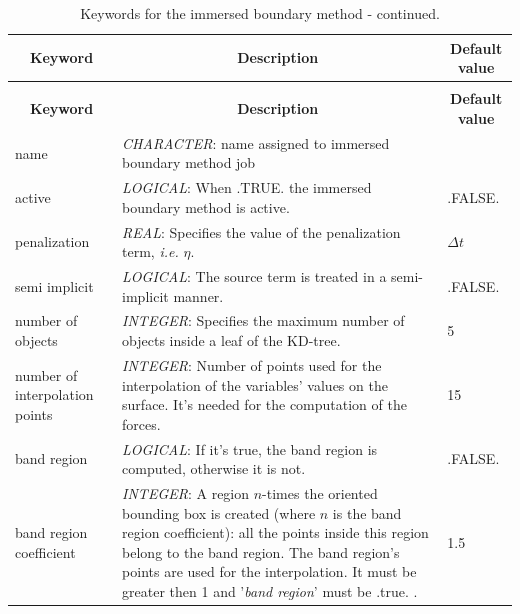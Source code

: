 \documentclass[a4paper,10pt]{report}
\begin{document}
\begin{longtable}{|p{4cm}|p{10cm}|p{2.2cm}|}
\caption{Keywords for the immersed boundary method.} \label{tab:IBMtab} \\
\hline
\multicolumn{1}{|c|}{\textbf{Keyword}} & \multicolumn{1}{c|}{\textbf{Description}} & \multicolumn{1}{c|}{\textbf{Default value}} \\ \hline
\endfirsthead

\caption{Keywords for the immersed boundary method - continued.} \\
\hline
\multicolumn{1}{|c|}{\textbf{Keyword}} & \multicolumn{1}{c|}{\textbf{Description}} & \multicolumn{1}{c|}{\textbf{Default value}} \\ \hline
\endhead

name & \textit{CHARACTER}: name assigned to immersed boundary method job &  \\ \hline

active & \textit{LOGICAL}: When .TRUE. the immersed boundary method is active. & .FALSE. \\ \hline

penalization & \textit{REAL}: Specifies the value of the penalization term, \textit{i.e.} $\eta$. & $\Delta t$ \\ \hline

semi implicit & \textit{LOGICAL}: The source term is treated in a semi-implicit manner. & .FALSE. \\ \hline


number of objects & \textit{INTEGER}: Specifies the maximum number of objects inside a leaf of the KD-tree. & 5 \\ \hline

number of interpolation points & \textit{INTEGER}: Number of points used for the interpolation of the variables' values on the surface. It's needed for the computation of the forces.  & 15 \\ \hline

band region & \textit{LOGICAL}: If it's true, the band region is computed, otherwise it is not. & .FALSE. \\ \hline

band region coefficient  & \textit{INTEGER}: A region $n$-times the oriented bounding box is created (where $n$ is the band region coefficient): all the points inside this region belong to the band region. The band region's points are used for the interpolation. It must be greater then 1 and '\textit{band region}' must be .true. . & 1.5 \\ \hline


\end{longtable}
\end{document}
